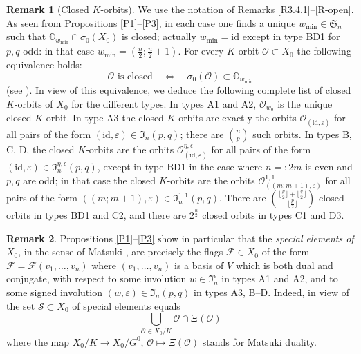 \documentclass{amsart}
\theoremstyle{definition}
\newtheorem{remark}{Remark}
\begin{document}
\begin{remark}[Closed $K$-orbits]
\label{R-closed}
We use the notation of Remarks \ref{R3.4.1}--\ref{R-open}.
As seen from Propositions \ref{P1}--\ref{P3}, in each case
one finds a unique $w_{\mathrm{min}}\in\mathfrak{S}_n$ such that $\mathbb{O}_{w_{\mathrm{min}}}\cap\sigma_0(X_0)$ is closed; 
actually $w_{\mathrm{min}}=\mathrm{id}$ except in type BD1 for $p,q$ odd:
in that case $w_{\mathrm{min}}=(\frac{n}{2};\frac{n}{2}+1)$.
For every $K$-orbit $\mathcal{O}\subset X_0$ the following equivalence holds:
\[
\mbox{$\mathcal{O}$ is closed}\quad \Leftrightarrow\quad \sigma_0(\mathcal{O})\subset\mathbb{O}_{w_{\mathrm{min}}}
\]
(see \cite{Brion,Richardson-Springer}). In view of this equivalence, we deduce the following complete list of closed $K$-orbits of $X_0$ for the different types.
In types A1 and A2, $\mathcal{O}_{w_0}$ is the unique closed $K$-orbit.
In type A3 the closed $K$-orbits are exactly the orbits
$\mathcal{O}_{(\mathrm{id},\varepsilon)}$ for all pairs of the form $(\mathrm{id},\varepsilon)\in\mathfrak{I}_n(p,q)$;
there are $\binom{n}{p}$ such orbits.
In types B, C, D, the closed $K$-orbits are the orbits
$\mathcal{O}^{\eta,\epsilon}_{(\mathrm{id},\varepsilon)}$ for all pairs of the form $(\mathrm{id},\varepsilon)\in\mathfrak{I}^{\eta,\epsilon}_n(p,q)$,
except in type BD1 in the case where $n=:2m$ is even and $p,q$ are odd;
in that case the closed $K$-orbits
are the orbits $\mathcal{O}^{1,1}_{((m;m+1),\varepsilon)}$
for all pairs of the form $((m;m+1),\varepsilon)\in\mathfrak{I}^{1,1}_n(p,q)$.
There are $\binom{\lfloor\frac{p}{2}\rfloor+\lfloor\frac{q}{2}\rfloor}{\lfloor\frac{p}{2}\rfloor}$ closed orbits in types BD1 and C2, and there are $2^{\frac{n}{2}}$ closed orbits in types C1 and D3.
\end{remark}


\begin{remark} Propositions
\ref{P1}--\ref{P3} show in particular that the {\em special elements
of $X_0$}, in the sense of Matsuki \cite{Matsuki, Matsuki3}, are
precisely the flags $\mathcal{F}\in X_0$ of the form
$\mathcal{F}=\mathcal{F}(v_1,\ldots,v_n)$ where $(v_1,\ldots,v_n)$
is a basis of $V$ which is both dual and conjugate, with
respect to some involution $w\in\mathfrak{I}_n^\epsilon$ in types A1
and A2, and to some signed involution
$(w,\varepsilon)\in\mathfrak{I}_n(p,q)$ in types A3, B--D. Indeed, in view of \cite{Matsuki, Matsuki3} the set
$\mathcal{S}\subset X_0$ of special elements equals
\[\bigcup_{\mathcal{O}\in X_0/K}\mathcal{O}\cap\Xi(\mathcal{O})\]
where the map $X_0/K\to X_0/G^0$, $\mathcal{O}\mapsto\Xi(\mathcal{O})$
stands for Matsuki duality.
\end{remark}
\end{document}
